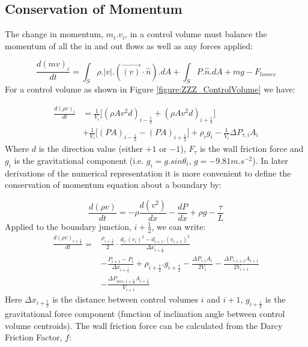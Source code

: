 \documentclass[11pt,letterpaper,titlepage]{article}
\newcommand{\half}{\frac{1}{2}}
\begin{document}
\subsection{Conservation of Momentum}
The change in momentum, $m_i.v_{i}$, in a control volume must balance the momentum of all the in and out flows as well as any forces applied:

\begin{equation*}
\frac{d(mv)_i}{dt}=\int_S \rho. |v|. (\vec{(v)}\cdot \hat{n}).dA + \int_S P.\hat{n}.dA+mg-F_{losses}
\end{equation*}
\newline
\noindent For a control volume as shown in Figure \ref{figure:ZZZ_ControlVolume} we have:

\begin{equation*}
\begin{aligned}
\frac{d(\rho v)_i}{dt}&=\frac{1}{V_i} \biggr[ (\rho A v^2 d)_{i-\half} +(\rho A v^2 d)_{i+\half}  \biggr] \\
&+\frac{1}{V_i} \biggr[ (PA)_{i-\half} - (PA)_{i+\half} \biggr]+\rho_ig_i-\frac{1}{V_i}\Delta P_{\tau,i}A_i
\end{aligned}
\end{equation*}
\newline
Where $d$ is the direction value (either $+1$ or $-1$), $F_{\tau}$ is the wall friction force and $g_i$ is the gravitational component (i.e. $g_i=g.sin\theta_i$, $g=-9.81 m.s^{-2}$). In later derivations of the numerical representation it is more convenient to define the conservation of momentum equation about a boundary by:

\begin{equation*}
\frac{d(\rho v)}{dt}=-\rho \frac{d(v^2)}{dx} -\frac{dP}{dx}+\rho g - \frac{\tau}{L}
\end{equation*}
\newline
Applied to the boundary junction, $i+\half$, we can write:
\begin{equation}
\begin{aligned}
\frac{d(\rho v)_{i+\half}}{dt}=&\frac{\rho_{i+\half}}{2}\cdot\frac{d_i.(v_{i})^2-d_{i+1}.(v_{i+1})^2}{\Delta x_{i+\half}} \\
&-\frac{P_{i+1}-P_i}{\Delta x_{i+\half}} + \rho_{i+\half}.g_{i+\half}-\frac{\Delta P_{\tau,i}A_i}{2V_i}-\frac{\Delta P_{\tau,i+1}A_{i+1}}{2V_{i+1}} \\
&-\frac{\Delta P_{loss,i+\half}A_{i+\half}}{V_{i+1}}
\end{aligned}
\end{equation}
\newline
Here $\Delta x_{i+\half}$ is the distance between control volumes $i$ and $i+1$, $g_{i+\half}$ is the gravitational force component (function of inclination angle between control volume centroids). The wall friction force can be calculated from the Darcy Friction Factor, $f$:
\end{document}
